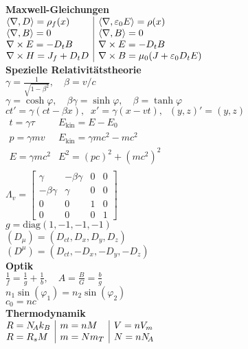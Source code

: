 \documentclass[a4paper,10pt,fleqn,twoside,twocolumn,dvipdfmx]{scrartcl}
\newcommand{\strong}[1]{\textsf{\textbf{#1}}}
\newcommand{\ds}{\displaystyle}
\begin{document}
\newpage

\noindent
\strong{Maxwell-Gleichungen}\\
$\begin{array}{@{}l|l}
\langle\nabla,D\rangle = \rho_f(x)
& \langle\nabla,\varepsilon_0 E\rangle = \rho(x)
\\
\langle\nabla,B\rangle = 0
& \langle\nabla,B\rangle = 0\\
\nabla\times E = -D_t B
& \nabla\times E = -D_t B\\
\nabla\times H = J_f+D_t D
& \nabla\times B = \mu_0 (J+\varepsilon_0 D_t E)
\end{array}$\\[4pt]
\strong{Spezielle Relativitätstheorie}\\
$\ds \gamma = \frac{1}{\sqrt{1-\beta^2}},\quad\beta=v/c$\\
$\gamma = \cosh\varphi,\quad
\beta\gamma = \sinh\varphi,\quad
\beta = \tanh\varphi$\\
$ct'=\gamma(ct-\beta x),\;\; x'=\gamma(x-vt),
\;\; (y,z)'=(y,z)$\\
${}\!\!\!\begin{array}{l|l}
t=\gamma\tau & E_\mathrm{kin} = E-E_0\\
p=\gamma mv & E_\mathrm{kin} = \gamma mc^2-mc^2\\
E=\gamma mc^2 & E^2 = (pc)^2 + (mc^2)^2\\
\end{array}$\\
$\Lambda_v = \begin{bmatrix}
\gamma & -\beta\gamma & 0 & 0\\
-\beta\gamma & \gamma & 0 & 0\\
0 & 0 & 1 & 0\\
0 & 0 & 0 & 1
\end{bmatrix}$\\
$g=\mathrm{diag}(1,-1,-1,-1)$\\
$(D_\mu) = (D_{ct},D_x,D_y,D_z)$\\
$(D^\mu) = (D_{ct},-D_x,-D_y,-D_z)$\\[4pt]
\strong{Optik}\\
$\ds\frac{1}{f}=\frac{1}{g}+\frac{1}{b},\quad
A = \frac{B}{G} = \frac{b}{g}$\\
$n_1\sin(\varphi_1) = n_2\sin(\varphi_2)$\\
$c_0 = nc$\\[4pt]
\strong{Thermodynamik}\\
$\begin{array}{@{}l|l|l}
R = N_{\!A} k_B & m = nM & V = nV_m\\
R = R_s M & m = Nm_T & N=nN_{\!A}
\end{array}$\\
\end{document}
